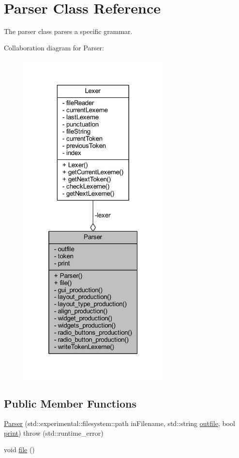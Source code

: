 \hypertarget{class_parser}{}\section{Parser Class Reference}
\label{class_parser}


The parser class parses a specific grammar.  




Collaboration diagram for Parser\+:
\nopagebreak
\begin{figure}[H]
\begin{center}
\leavevmode
\includegraphics[width=217pt]{d0/d5d/class_parser__coll__graph}
\end{center}
\end{figure}
\subsection*{Public Member Functions}
\begin{DoxyCompactItemize}
\item 
\hyperlink{class_parser_a91939ccabb3a2337cd959386b36fc8b0}{Parser} (std\+::experimental\+::filesystem\+::path in\+Filename, std\+::string \hyperlink{class_parser_aa5fb86beefedf2e8bbefca807fc74bca}{outfile}, bool \hyperlink{class_parser_a127bec7e69bb49eadf9f935bd680fb6c}{print})  throw (std\+::runtime\+\_\+error)
\item 
void \hyperlink{class_parser_aa419c434b0e0def8c101bf906928a5ba}{file} ()
\end{DoxyCompactItemize}
